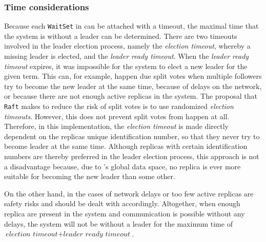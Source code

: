 \subsubsection{Time considerations}
\label{subsub:timeConsiderations}
Because each \texttt{WaitSet} in  can be attached with a timeout, the maximal time that the system is without a leader can be determined.
There are two timeouts involved in the leader election process, namely the \textit{election timeout}, whereby a missing leader is elected, and the \textit{leader ready timeout}.
When the \textit{leader ready timeout} expires, it was impossible for the system to elect a new leader for the given term.
This can, for example, happen due split votes when multiple followers try to become the new leader at the same time, because of delays on the network, or because there are not enough active replicas in the system.
The proposal that \texttt{Raft} makes to reduce the risk of split votes is to use randomized \textit{election timeouts}.
However, this does not prevent split votes from happen at all.
Therefore, in this implementation, the \textit{election timeout} is made directly dependent on the replicas unique identification number, so that they never try to become leader at the same time.
Although replicas with certain identification numbers are thereby preferred in the leader election process, this approach is not a disadvantage because, due to 's global data space, no replica is ever more suitable for becoming the new leader than some other.

On the other hand, in the cases of network delays or too few active replicas are safety risks and should be dealt with accordingly.
Altogether, when enough replica are present in the system and communication is possible without any delays, the system will not be without a leader for the maximum time of $\textit{election timeout} + \textit{leader ready timeout}$.


